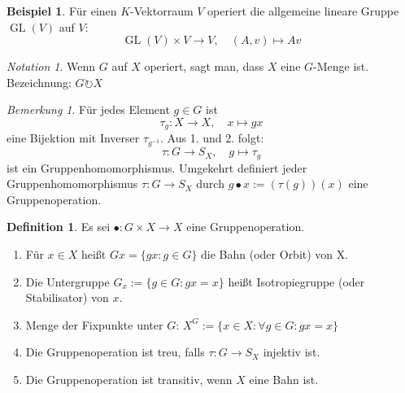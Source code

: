 \documentclass[12pt]{scrartcl} %
\DeclareMathOperator{\GL}{GL}
\theoremstyle{definition}
\newtheorem*{defn}{Definition}
\newtheorem{ex}{Beispiel}
\theoremstyle{remark}
\newtheorem*{notation}{Notation}
\newtheorem*{nb}{Bemerkung}
\begin{document}
\begin{ex}
	Für einen $K$-Vektorraum \(V\) operiert die allgemeine lineare Gruppe $\GL(V)$ auf $V$:
	$$\GL(V) \times V \to V, \quad (A,v) \mapsto Av$$
\end{ex}

\begin{notation}
	Wenn $G$ auf $X$ operiert, sagt man, dass $X$ eine $G$-Menge ist.
	Bezeichnung: $G\circlearrowright X$
\end{notation}

\begin{nb}
	Für jedes Element $g\in G$ ist $$\tau_g: X \rightarrow X, \quad x \mapsto gx$$ eine Bijektion mit Inverser $\tau_{g^{-1}}$.
	Aus 1. und 2. folgt:
	$$\tau: G \rightarrow S_X, \quad g \mapsto \tau_g$$ ist ein Gruppenhomomorphismus.
	Umgekehrt definiert jeder Gruppenhomomorphismus $\tau: G \rightarrow S_X$ durch $g \bullet x := (\tau(g))(x)$ eine Gruppenoperation.
\end{nb}
	
\begin{defn} Es sei $\bullet: G \times X \to X$ eine Gruppenoperation.
	\begin{enumerate}
	\item Für $x\in X$ heißt $Gx=\{gx : g \in G\}$ die Bahn (oder Orbit) von X. 
	\item Die Untergruppe $G_x:=\{g\in G : gx=x\}$ heißt Isotropiegruppe (oder Stabilisator) von $x$.
	\item Menge der Fixpunkte unter $G$: $X^G:=\{x \in X : \forall g \in G: gx=x\}$
	\item Die Gruppenoperation ist treu, falls $\tau:G \rightarrow S_X$ injektiv ist.
	\item Die Gruppenoperation ist transitiv, wenn $X$ eine Bahn ist.
	\end{enumerate}
\end{defn}
	
\end{document}

